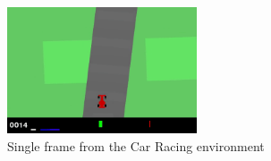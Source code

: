 \begin{figure}[H]
  \centering
  \includegraphics[width=0.5\textwidth]{figures/images/car_racing_frame.png}
  \caption[Car Racing frame]{Single frame from the Car Racing environment}
  \label{fig:car_racing_frame}
\end{figure}

